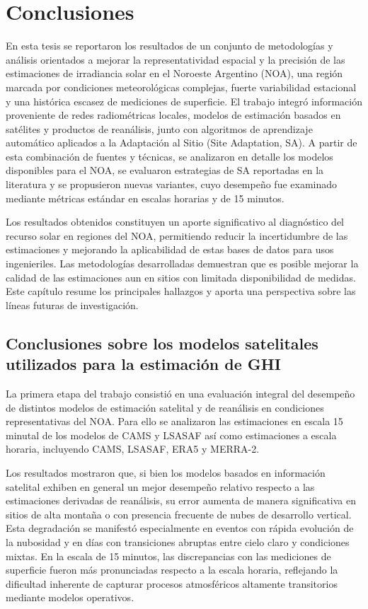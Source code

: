 \rhead{\newtitle}
\cfoot{\thepage}
\renewcommand{\headrulewidth}{1pt}
\renewcommand{\footrulewidth}{1pt}
\chapter{Conclusiones}

En esta tesis se reportaron los resultados de un conjunto de metodologías y análisis orientados a mejorar la representatividad espacial y la precisión de las estimaciones de irradiancia solar en el Noroeste Argentino (NOA), una región marcada por condiciones meteorológicas complejas, fuerte variabilidad estacional y una histórica escasez de mediciones de superficie. El trabajo integró información proveniente de redes radiométricas locales, modelos de estimación basados en satélites y productos de reanálisis, junto con algoritmos de aprendizaje automático aplicados a la Adaptación al Sitio (Site Adaptation, SA). A partir de esta combinación de fuentes y técnicas, se analizaron en detalle los modelos disponibles para el NOA, se evaluaron estrategias de SA reportadas en la literatura y se propusieron nuevas variantes, cuyo desempeño fue examinado mediante métricas estándar en escalas horarias y de 15 minutos.


Los resultados obtenidos constituyen un aporte significativo al diagnóstico del recurso solar en regiones del NOA, permitiendo reducir la incertidumbre de las estimaciones y mejorando la aplicabilidad de estas bases de datos para usos ingenieriles. Las metodologías desarrolladas demuestran que es posible mejorar la calidad de las estimaciones aun en sitios con limitada disponibilidad de medidas. Este capítulo resume los principales hallazgos y aporta una perspectiva sobre las líneas futuras de investigación.

\section{Conclusiones sobre los modelos satelitales utilizados para la estimación de GHI}
La primera etapa del trabajo consistió en una evaluación integral del desempeño de distintos modelos de estimación satelital y de reanálisis en condiciones representativas del NOA. Para ello se analizaron las estimaciones en escala 15 minutal de los modelos de CAMS y LSASAF así como estimaciones a escala horaria, incluyendo CAMS, LSASAF, ERA5 y MERRA-2.

Los resultados mostraron que, si bien los modelos basados en información satelital exhiben en general un mejor desempeño relativo respecto a las estimaciones derivadas de reanálisis, su error aumenta de manera significativa en sitios de alta montaña o con presencia frecuente de nubes de desarrollo vertical. Esta degradación se manifestó especialmente en eventos con rápida evolución de la nubosidad y en días con transiciones abruptas entre cielo claro y condiciones mixtas. En la escala de 15 minutos, las discrepancias con las mediciones de superficie fueron más pronunciadas respecto a la escala horaria, reflejando la dificultad inherente de capturar procesos atmosféricos altamente transitorios mediante modelos operativos.

